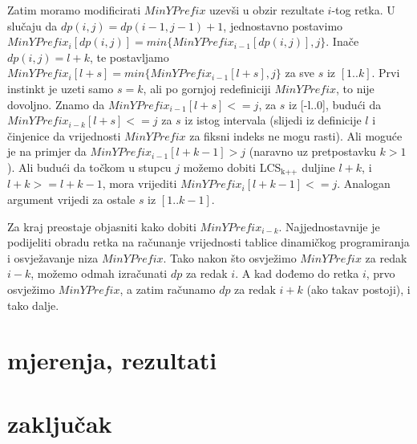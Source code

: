 \documentclass[11pt]{article}
\begin{document}
Zatim moramo modificirati $MinYPrefix$ uzevši u obzir rezultate
$i$-tog retka. U slučaju da $dp(i, j) = dp(i-1,j-1)+1$,
jednostavno postavimo $MinYPrefix_i[dp(i,j)] =
    min\{MinYPrefix_{i-1}[dp(i,j)], j\}$.  Inače $dp(i, j) = l+k$, te
postavljamo $MinYPrefix_i[l+s] = min\{MinYPrefix_{i-1}[l+s], j\}$
za sve $s$ iz $[1..k]$. Prvi instinkt je uzeti samo $s = k$, ali
po gornjoj redefiniciji $MinYPrefix$, to nije dovoljno. Znamo da
$MinYPrefix_{i-1}[l+s] <= j$, za $s$ iz [-l..0], budući da
$MinYPrefix_{i-k}[l+s] <= j$ za $s$ iz istog intervala (slijedi iz
definicije $l$ i činjenice da vrijednosti $MinYPrefix$ za fiksni
indeks ne mogu rasti). Ali moguće je na primjer da
$MinYPrefix_{i-1}[l+k-1] > j$ (naravno uz pretpostavku $k > 1$).
Ali budući da točkom u stupcu $j$ možemo dobiti LCS$_{\text{k++}}$ duljine
$l+k$, i $l+k >= l+k-1$, mora vrijediti $MinYPrefix_i[l+k-1] <=
    j$. Analogan argument vrijedi za ostale $s$ iz $[1..k-1]$.

Za kraj preostaje objasniti kako dobiti $MinYPrefix_{i-k}$.
Najjednostavnije je podijeliti obradu retka na računanje
vrijednosti tablice dinamičkog programiranja i osvježavanje niza
$MinYPrefix$. Tako nakon što osvježimo $MinYPrefix$ za redak
$i-k$, možemo odmah izračunati $dp$ za redak $i$. A kad dođemo do
retka $i$, prvo osvježimo $MinYPrefix$, a zatim računamo $dp$ za
redak $i+k$ (ako takav postoji), i tako dalje.

\section{mjerenja, rezultati}
\label{sec-3}

\section{zaključak}
\label{sec-4}
\end{document}
